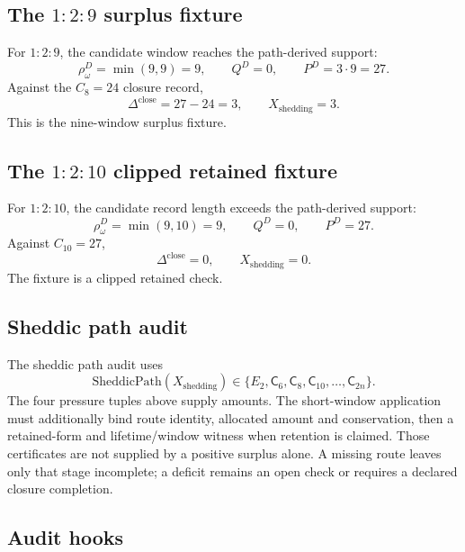 \subsection{The \texorpdfstring{\(1{:}2{:}9\)}{1:2:9} surplus fixture}\label{manual:short-window:129}
For \(1{:}2{:}9\), the candidate window reaches the path-derived support:
\[
\rho^D_\omega=\min(9,9)=9,
\qquad
Q^D=0,
\qquad
P^D=3\cdot9=27.
\]
Against the \(C_8=24\) closure record,
\[
\Delta^{\mathrm{close}}=27-24=3,
\qquad
X_{\mathrm{shedding}}=3.
\]
This is the nine-window surplus fixture.

\subsection{The \texorpdfstring{\(1{:}2{:}10\)}{1:2:10} clipped retained fixture}\label{manual:short-window:1210}
For \(1{:}2{:}10\), the candidate record length exceeds the path-derived support:
\[
\rho^D_\omega=\min(9,10)=9,
\qquad
Q^D=0,
\qquad
P^D=27.
\]
Against \(C_{10}=27\),
\[
\Delta^{\mathrm{close}}=0,
\qquad
X_{\mathrm{shedding}}=0.
\]
The fixture is a clipped retained check.

\subsection{Sheddic path audit}\label{manual:short-window:shedpath-audit}
The sheddic path audit uses
\[
\mathrm{SheddicPath}(X_{\mathrm{shedding}})
\in
\{E_2,\mathsf C_6,\mathsf C_8,\mathsf C_{10},\ldots,\mathsf C_{2n}\}.
\]
The four pressure tuples above supply amounts. The short-window application
must additionally bind route identity, allocated amount and conservation,
then a retained-form and lifetime/window witness when retention is claimed.
Those certificates are not supplied by a positive surplus alone. A missing
route leaves only that stage incomplete; a deficit remains an open check or
requires a declared closure completion.

\subsection{Audit hooks}\label{manual:short-window:audit-hooks}
